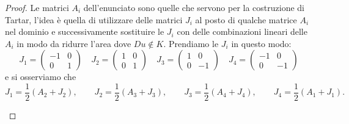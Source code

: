 \documentclass[a4paper,11pt]{book}
\theoremstyle{plain}
\theoremstyle{definition}
\theoremstyle{remark}
\begin{document}
\begin{proof}
	Le matrici $A_{i}$ dell'enunciato sono quelle che servono per la costruzione di Tartar, l'idea è quella di utilizzare delle matrici $J_i$ al posto di qualche matrice $A_i$ nel dominio e successivamente sostituire le $J_i$ con delle combinazioni lineari delle $A_i$ in modo da ridurre l'area dove $Du\not\in K$. Prendiamo le $J_i$ in questo modo:
	\[
		J_1 = \begin{pmatrix}
	                	-1 & 0\\
	                	0 & 1
	                \end{pmatrix}\quad
	    J_2 = \begin{pmatrix}
	                	1 & 0\\
	                	0 & 1
	                \end{pmatrix}\quad
		J_3 = \begin{pmatrix}
			1 & 0\\
			0 & -1
		\end{pmatrix}\quad
		J_4 = \begin{pmatrix}
			-1 & 0\\
			0 & -1
		\end{pmatrix}
	\]
	e si osserviamo che
	\[
		J_1=\frac{1}{2}(A_2+J_2),\qquad J_2=\frac{1}{2}(A_3+J_3),\qquad J_3=\frac{1}{2}(A_4+J_4),\qquad J_4=\frac{1}{2}(A_1+J_1).
	\]
	\begin{comment}
	\begin{figure}[H]
		\centering
		\caption{Rappresentazione grafica delle matrici $A_i$ e $J_i$}
		\texttt{[image: matrix.png]}
	\end{figure}
	\end{comment}
	
	
	\begin{figure}[H]
		\begin{minipage}[c]{0.66\textwidth}
		

\end{minipage}
\end{figure}
\end{proof}
\end{document}
